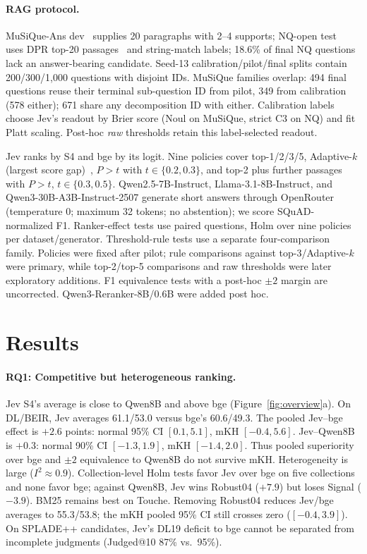 \documentclass[sigconf,nonacm]{acmart}
\begin{document}
\paragraph{RAG protocol.}
MuSiQue-Ans dev~\cite{trivedi2022musique} supplies 20 paragraphs with 2--4 supports; NQ-open test~\cite{kwiatkowski2019nq} uses DPR top-20 passages~\cite{karpukhin2020dpr} and string-match labels; 18.6\% of final NQ questions lack an answer-bearing candidate. Seed-13 calibration/pilot/final splits contain 200/300/1,000 questions with disjoint IDs. MuSiQue families overlap: 494 final questions reuse their terminal sub-question ID from pilot, 349 from calibration (578 either); 671 share any decomposition ID with either. Calibration labels choose Jev's readout by Brier score (Noul on MuSiQue, strict C3 on NQ) and fit Platt scaling. Post-hoc \emph{raw} thresholds retain this label-selected readout.

Jev ranks by S4 and bge by its logit. Nine policies cover top-1/2/3/5, Adaptive-$k$ (largest score gap)~\cite{adaptivek2025}, $P>t$ with $t\in\{0.2,0.3\}$, and top-2 plus further passages with $P>t$, $t\in\{0.3,0.5\}$. Qwen2.5-7B-Instruct, Llama-3.1-8B-Instruct, and Qwen3-30B-A3B-Instruct-2507 generate short answers through OpenRouter (temperature 0; maximum 32 tokens; no abstention); we score SQuAD-normalized F1. Ranker-effect tests use paired questions, Holm over nine policies per dataset/generator. Threshold-rule tests use a separate four-comparison family. Policies were fixed after pilot; rule comparisons against top-3/Adaptive-$k$ were primary, while top-2/top-5 comparisons and raw thresholds were later exploratory additions. F1 equivalence tests with a post-hoc $\pm2$ margin are uncorrected. Qwen3-Reranker-8B/0.6B were added post hoc.

\section{Results}

\paragraph{RQ1: Competitive but heterogeneous ranking.}
Jev S4's average is close to Qwen8B and above bge (Figure~\ref{fig:overview}a). On DL/BEIR, Jev averages 61.1/53.0 versus bge's 60.6/49.3. The pooled Jev--bge effect is $+2.6$ points: normal 95\% CI $[0.1,5.1]$, mKH $[-0.4,5.6]$. Jev--Qwen8B is $+0.3$: normal 90\% CI $[-1.3,1.9]$, mKH $[-1.4,2.0]$. Thus pooled superiority over bge and $\pm2$ equivalence to Qwen8B do not survive mKH. Heterogeneity is large ($I^2\approx0.9$). Collection-level Holm tests favor Jev over bge on five collections and none favor bge; against Qwen8B, Jev wins Robust04 ($+7.9$) but loses Signal ($-3.9$). BM25 remains best on Touche. Removing Robust04 reduces Jev/bge averages to 55.3/53.8; the mKH pooled 95\% CI still crosses zero ($[-0.4,3.9]$). On SPLADE++ candidates, Jev's DL19 deficit to bge cannot be separated from incomplete judgments (Judged@10 87\% vs.\ 95\%).
\end{document}
